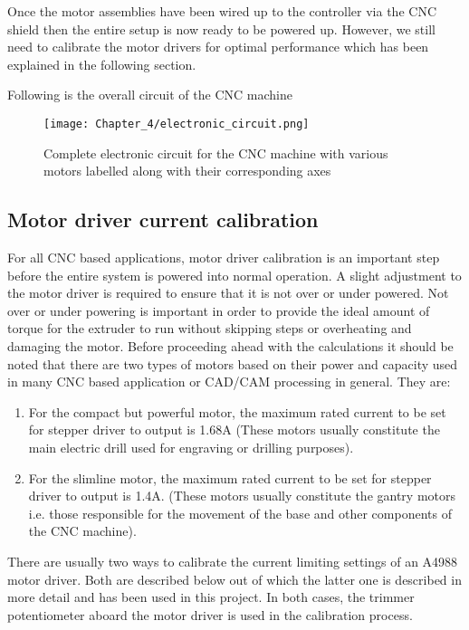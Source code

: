 Once the motor assemblies have been wired up to the controller via the CNC shield then the entire setup is now ready to be powered up. However, we still need to calibrate the motor drivers for optimal performance which has been explained in the following section.

Following is the overall circuit of the CNC machine 

\begin{figure}[h]
    \centering
    \texttt{[image: Chapter\_4/electronic\_circuit.png]}
    \caption{Complete electronic circuit for the CNC machine with various motors labelled along with their corresponding axes}
    \label{fig:electronic_circuit}
\end{figure}


\subsection{Motor driver current calibration} \label{motor_calib}

For all CNC based applications, motor driver calibration is an important step before the entire system is powered into normal operation. A slight adjustment to the motor driver is required to ensure that it is not over or under powered. Not over or under powering is important in order to provide the ideal amount of torque for the extruder to run without skipping steps or overheating and damaging the motor. Before proceeding ahead with the calculations it should be noted that there are two types of motors based on their power and capacity used in many CNC based application or CAD/CAM processing in general. They are:

\begin{enumerate}
 \item For the compact but powerful motor, the maximum rated current to be set for stepper driver to output is 1.68A (These motors usually constitute the main electric drill used for engraving or drilling purposes).
 \item For the slimline motor, the maximum rated current to be set for stepper driver to output is 1.4A. (These motors usually constitute the gantry motors i.e. those responsible for the movement of the base and other components of the CNC machine).
\end{enumerate}

There are usually two ways to calibrate the current limiting settings of an A4988 motor driver. Both are described below out of which the latter one is described in more detail and has been used in this project. In both cases, the trimmer potentiometer aboard the motor driver is used in the calibration process.  \cite{online_calib_guide}

